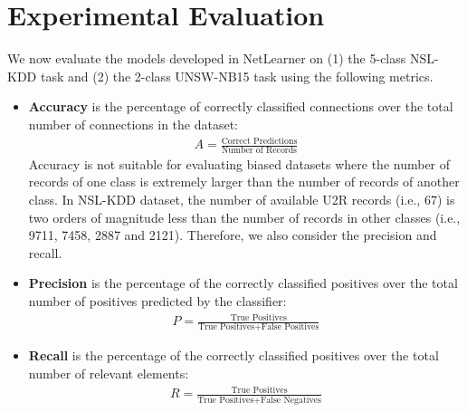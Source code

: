 \section{Experimental Evaluation}

We now evaluate the models developed in NetLearner on (1) the 5-class NSL-KDD task and (2) the 2-class UNSW-NB15 task using the following metrics.
\begin{itemize}
    \item \textbf{Accuracy} is the percentage of correctly classified connections
        over the total number of connections in the dataset:
        \begin{align}
            A = \frac{\text{Correct Predictions}}{\text{Number of Records}}
        \end{align} 
        Accuracy is not suitable for evaluating biased datasets where the number
        of records of one class is extremely larger than the number of
        records of another class.
        In NSL-KDD dataset, the number of available U2R records (i.e., 67)
        is two orders of magnitude less than the number of records in other classes
        (i.e., 9711, 7458, 2887 and 2121).
        Therefore, we also consider the precision and recall.
    \item \textbf{Precision} is the percentage of the correctly classified positives over
        the total number of positives predicted by the classifier:
                \begin{align}
                    P = \frac{\text{True Positives}}{\text{True Positives} + \text{False Positives}}
                \end{align}
    \item \textbf{Recall} is the percentage of the correctly classified positives over
        the total number of relevant elements:
                \begin{align}
                    R = \frac{\text{True Positives}}{\text{True Positives} + \text{False Negatives}}
                \end{align}
\end{itemize}


